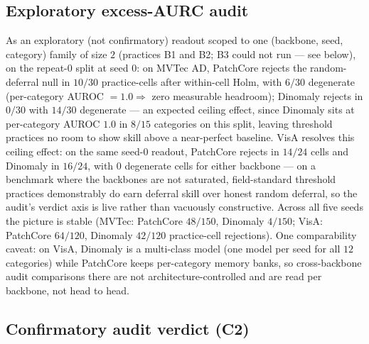 \documentclass[11pt]{article}
\begin{document}
\subsection{Exploratory excess-AURC audit}
\label{sec:auditres}

As an exploratory (not confirmatory) readout scoped to one (backbone, seed, category) family of
size $2$ (practices B1 and B2; B3 could not run --- see below), on the
repeat-$0$ split at seed $0$: on MVTec AD, PatchCore rejects the random-deferral null in $10/30$
practice-cells after within-cell Holm, with $6/30$ degenerate (per-category AUROC $=1.0
\Rightarrow$ zero measurable headroom); Dinomaly rejects in $0/30$ with $14/30$ degenerate ---
an expected ceiling effect, since Dinomaly sits at per-category AUROC $1.0$ in $8/15$
categories on this split, leaving threshold practices no room to show skill above a near-perfect
baseline. VisA resolves this ceiling effect: on the same seed-$0$ readout, PatchCore
rejects in $14/24$ cells and Dinomaly in $16/24$, with $0$ degenerate cells for either backbone
--- on a benchmark where the backbones are not saturated, field-standard threshold practices
demonstrably do earn deferral skill over honest random deferral, so the audit's verdict axis is
live rather than vacuously constructive. Across all five seeds the picture is stable (MVTec:
PatchCore $48/150$, Dinomaly $4/150$; VisA: PatchCore $64/120$, Dinomaly $42/120$ practice-cell
rejections). One comparability caveat: on VisA, Dinomaly is a multi-class model (one model per
seed for all $12$ categories) while PatchCore keeps per-category memory banks, so cross-backbone
audit comparisons there are not architecture-controlled and are read per backbone, not head to
head.

\subsection{Confirmatory audit verdict (C2)}
\label{sec:c2}
\end{document}

